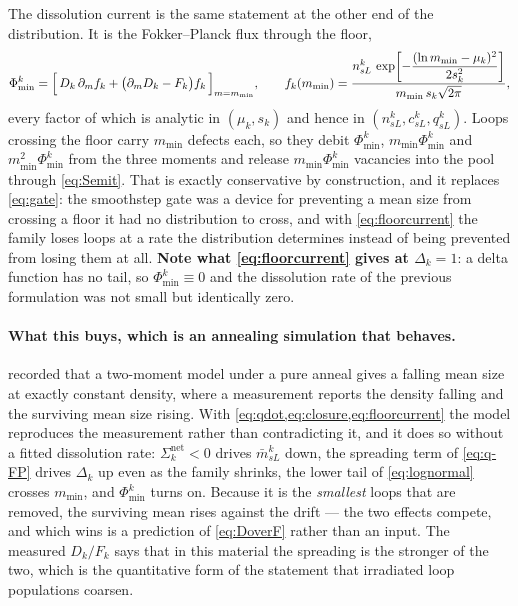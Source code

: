 \documentclass{article}
\begin{document}
The dissolution current is the same statement at the other end of the
distribution. It is the Fokker--Planck flux through the floor,
\begin{equation}
  \Phi^k_{\min}
   =\Bigl[\,D_k\,\partial_m f_k
          +\bigl(\partial_m D_k-F_k\bigr)f_k\,\Bigr]_{m=m_{\min}},
  \qquad
  f_k(m_{\min})=\frac{n^k_{sL}\,
     \exp\!\left[-\dfrac{(\ln m_{\min}-\mu_k)^{2}}{2s_k^{2}}\right]}
     {m_{\min}\,s_k\sqrt{2\pi}},
  \label{eq:floorcurrent}
\end{equation}
every factor of which is analytic in $(\mu_k,s_k)$ and hence in
$(n^k_{sL},c^k_{sL},q^k_{sL})$. Loops crossing the floor carry $m_{\min}$
defects each, so they debit $\Phi^k_{\min}$, $m_{\min}\Phi^k_{\min}$ and
$m_{\min}^2\Phi^k_{\min}$ from the three moments and release
$m_{\min}\Phi^k_{\min}$ vacancies into the pool through \cref{eq:Semit}. That is
exactly conservative by construction, and it replaces \cref{eq:gate}: the
smoothstep gate was a device for preventing a mean size from crossing a floor it
had no distribution to cross, and with \cref{eq:floorcurrent} the family loses
loops at a rate the distribution determines instead of being prevented from
losing them at all. \textbf{Note what \cref{eq:floorcurrent} gives at
$\Delta_k=1$}: a delta function has no tail, so $\Phi^k_{\min}\equiv0$ and the
dissolution rate of the previous formulation was not small but identically zero.

\paragraph{What this buys, which is an annealing simulation that behaves.}
 recorded that a two-moment model under a pure anneal gives a
falling mean size at exactly constant density, where a measurement reports the
density falling and the surviving mean size rising. With
\cref{eq:qdot,eq:closure,eq:floorcurrent} the model reproduces the measurement
rather than contradicting it, and it does so without a fitted dissolution rate:
$\Sigma^{\mathrm{net}}_k<0$ drives $\bar m^k_{sL}$ down, the spreading term of
\cref{eq:q-FP} drives $\Delta_k$ up even as the family shrinks, the lower tail of
\cref{eq:lognormal} crosses $m_{\min}$, and $\Phi^k_{\min}$ turns on. Because it
is the \emph{smallest} loops that are removed, the surviving mean rises against
the drift --- the two effects compete, and which wins is a prediction of
\cref{eq:DoverF} rather than an input. The measured $D_k/F_k$ says that in this
material the spreading is the stronger of the two, which is the quantitative form
of the statement that irradiated loop populations coarsen.
\end{document}
